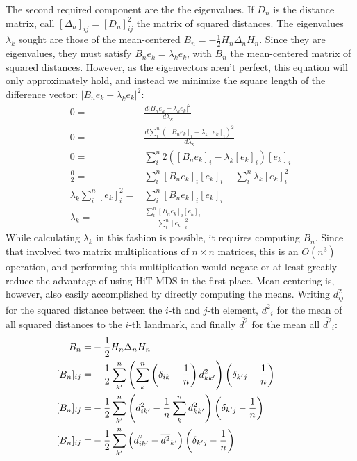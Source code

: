 \documentclass[10pt,fleqn,a4paper]{article}
\newcommand{\negmuchspace}{\negthinspace\negthinspace\negthinspace\negthinspace\negthinspace\negthinspace\negthinspace\negthinspace\negthinspace\negthinspace\negthinspace\negthinspace\negthinspace\negthinspace\negthinspace\negthinspace\negthinspace\negthinspace}
\newcommand{\ds}[1]{d^2_{#1}}
\newcommand{\dsa}[1]{\overline{d^2}_{#1}}
\begin{document}
\begin{twocolumn}
The second required component are the the eigenvalues.  If $D_n$ is the distance matrix, call $[\Delta_n]_{ij} = [D_n]_{ij}^2$ the matrix of squared distances.  The eigenvalues $\lambda_k$ sought are those of the mean-centered $B_n = -\frac{1}{2} H_n \Delta_n H_n$. Since they are eigenvalues, they must satisfy $B_n e_k = \lambda_k e_k$, with $B_n$ the mean-centered matrix of squared distances.  However, as the eigenvectors aren't perfect, this equation will only approximately hold, and instead we minimize the square length of the difference vector: $| B_n e_k - \lambda_k e_k |^2$:
% 
\begin{align}
0           = & \frac {d | B_n e_k - \lambda_k e_k |^2}{d \lambda_k}   \\
0           = & \frac {d \sum_i^n ([B_n e_k]_i - \lambda_k [e_k]_i )^2 }{d \lambda_k}   \\
0           = & \sum_i^n 2([B_n e_k]_i - \lambda_k [e_k]_i )[e_k]_i  \\
\frac{0}{2} = & \sum_i^n [B_n e_k]_i [e_k]_i - \sum_i^n \lambda_k [e_k]_i^2  \\
\lambda_k \sum_i^n  [e_k]_i^2  = & \sum_i^n [B_n e_k]_i [e_k]_i   \\
\lambda_k   = & \frac{\sum_i^n [B_n e_k]_i [e_k]_i}{\sum_i^n  [e_k]_i^2} \label{eqLambda1}  
\end{align}
%
While calculating $\lambda_k$ in this fashion is possible, it requires computing $B_n$.  Since that involved two matrix multiplications of $n \times n$ matrices, this is an $O(n^3)$ operation, and performing this multiplication would negate or at least greatly reduce the advantage of using HiT-MDS in the first place.  Mean-centering is, however, also easily accomplished by directly computing the means.  Writing $\ds{ij}$ for the squared distance between the $i$-th and $j$-th element, $\dsa{i}$ for the mean of all squared distances to the $i$-th landmark, and finally $\dsa{}$ for the mean all $\dsa{i}$:
%
\begin{align}
\negmuchspace B_n=& -\frac{1}{2} H_n \Delta_n H_n \\
\negmuchspace[B_n]_{ij}=& -\frac{1}{2} \sum_{k'}^n \left(\sum_k^n \left(\delta_{ik}-\frac{1}{n}\right) \ds{kk'}\right) \left(\delta_{k'j}-\frac{1}{n}\right) \\
\negmuchspace[B_n]_{ij}=& -\frac{1}{2} \sum_{k'}^n \left(\ds{ik'}-\frac{1}{n}\sum_k^n \ds{kk'}\right) \left(\delta_{k'j}-\frac{1}{n}\right) \\
\negmuchspace[B_n]_{ij}=& -\frac{1}{2} \sum_{k'}^n \left(\ds{ik'}-\dsa{k'}\right) \left(\delta_{k'j}-\frac{1}{n}\right) \\

\end{align}
\end{twocolumn}
\end{document}
